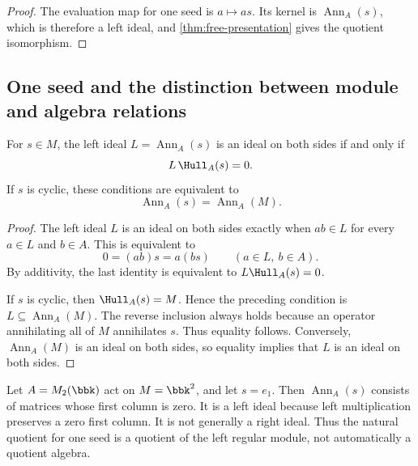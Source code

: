 \begin{proof}
The evaluation map for one seed is $a\mapsto as$.  Its kernel is $\operatorname{Ann}_A(s)$, which is therefore a left ideal, and \cref{thm:free-presentation} gives the quotient isomorphism.
\end{proof}

\subsection{One seed and the distinction between module and algebra relations}
\begin{proposition}
\label{prop:two-sided-annihilator}
For $s\in M$, the left ideal $L=\operatorname{Ann}_A(s)$ is an ideal on both sides if and only if
\[
L\,\Hull_A(s)=0.
\]
If $s$ is cyclic, these conditions are equivalent to
\[
\operatorname{Ann}_A(s)=\operatorname{Ann}_A(M).
\]
\end{proposition}

\begin{proof}
The left ideal $L$ is an ideal on both sides exactly when $ab\in L$ for every $a\in L$ and $b\in A$.  This is equivalent to
\[
0=(ab)s=a(bs)
\qquad(a\in L,\ b\in A).
\]
By additivity, the last identity is equivalent to $L\Hull_A(s)=0$.

If $s$ is cyclic, then $\Hull_A(s)=M$.  Hence the preceding condition is $L\subseteq\operatorname{Ann}_A(M)$.  The reverse inclusion always holds because an operator annihilating all of $M$ annihilates $s$.  Thus equality follows.  Conversely, $\operatorname{Ann}_A(M)$ is an ideal on both sides, so equality implies that $L$ is an ideal on both sides.
\end{proof}

\begin{microexample}[title={Why a seed annihilator need not be an ideal on both sides}]
Let \(A=M_2(\bbk)\) act on \(M=\bbk^2\), and let \(s=e_1\).  Then \(\operatorname{Ann}_A(s)\) consists of matrices whose first column is zero.  It is a left ideal because left multiplication preserves a zero first column.  It is not generally a right ideal.  Thus the natural quotient for one seed is a quotient of the left regular module, not automatically a quotient algebra.
\end{microexample}



